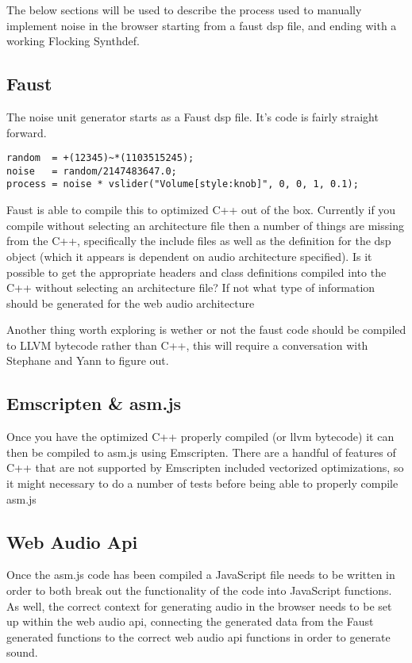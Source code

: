 \documentclass[runningheads,a4paper]{llncs}
\begin{document}
The below sections will be used to describe the process used to manually implement noise in the browser starting from a faust dsp file, and ending with a working Flocking Synthdef.

\subsection{Faust}

The noise unit generator starts as a Faust dsp file.  It's code is fairly straight forward.

\begin{verbatim}
random  = +(12345)~*(1103515245);
noise   = random/2147483647.0;
process = noise * vslider("Volume[style:knob]", 0, 0, 1, 0.1);
\end{verbatim}

Faust is able to compile this to optimized C++ out of the box.  Currently if you compile without selecting an architecture file then a number of things are missing from the C++, specifically the include files as well as the definition for the dsp object (which it appears is dependent on audio architecture specified). Is it possible to get the appropriate headers and class definitions compiled into the C++ without selecting an architecture file?  If not what type of information should be generated for the web audio architecture

Another thing worth exploring is wether or not the faust code should be compiled to LLVM bytecode rather than C++, this will require a conversation with Stephane and Yann to figure out.

\subsection{Emscripten \& asm.js}

Once you have the optimized C++ properly compiled (or llvm bytecode) it can then be compiled to asm.js using Emscripten.  There are a handful of features of C++ that are not supported by Emscripten included vectorized optimizations, so it might necessary to do a number of tests before being able to properly compile asm.js

\subsection{Web Audio Api}

Once the asm.js code has been compiled a JavaScript file needs to be written in order to both break out the functionality of the code into JavaScript functions.  As well, the correct context for generating audio in the browser needs to be set up within the web audio api, connecting the generated data from the Faust generated functions to the correct web audio api functions in order to generate sound.
\end{document}
